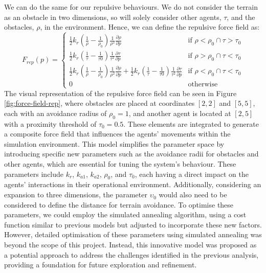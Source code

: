 \documentclass[12pt]{article}
\begin{document}
We can do the same for our repulsive behaviours. We do not consider the terrain as an obstacle in two dimensions, so will solely consider other agents, $\tau$, and the obstacles, $\rho$, in the environment. Hence, we can define the repulsive force field as:
\begin{equation}
    F_{rep}(p) = 
    \begin{cases}
        \frac{1}{2}k_r(\frac{1}{\rho}-\frac{1}{\rho_{0}})\frac{1}{\rho^2}\frac{\partial \rho}{\partial p} & \text{if } \rho < \rho_{0} \cap \tau > \tau_{0} \\
        \frac{1}{2}k_r(\frac{1}{\tau}-\frac{1}{\tau{0}})\frac{1}{\tau^2}\frac{\partial \tau}{\partial p} & \text{if } \rho > \rho_{0} \cap \tau < \tau_{0} \\
        \frac{1}{2}k_r(\frac{1}{\rho}-\frac{1}{\rho_{0}})\frac{1}{\rho^2}\frac{\partial \rho}{\partial p} + \frac{1}{2}k_r(\frac{1}{\tau}-\frac{1}{\tau{0}})\frac{1}{\tau^2}\frac{\partial \tau}{\partial p} & \text{if } \rho < \rho_{0} \cap \tau < \tau_{0} \\
        0 & \text{otherwise}
    \end{cases}
\end{equation}
The visual representation of the repulsive force field can be seen in Figure \ref{fig:force-field-rep}, where obstacles are placed at coordinates \([2,2]\) and \([5,5]\), each with an avoidance radius of \(\rho_0 = 1\), and another agent is located at \([2,5]\) with a proximity threshold of \(\tau_0 = 0.5\). These elements are integrated to generate a composite force field that influences the agents' movements within the simulation environment. This model simplifies the parameter space by introducing specific new parameters such as the avoidance radii for obstacles and other agents, which are essential for tuning the system's behaviour. These parameters include \(k_r\), \(k_{a1}\), \(k_{a2}\), \(\rho_0\), and \(\tau_0\), each having a direct impact on the agents' interactions in their operational environment. Additionally, considering an expansion to three dimensions, the parameter \(\upsilon_0\) would also need to be considered to define the distance for terrain avoidance. To optimise these parameters, we could employ the simulated annealing algorithm, using a cost function similar to previous models but adjusted to incorporate these new factors. However, detailed optimisation of these parameters using simulated annealing was beyond the scope of this project. Instead, this innovative model was proposed as a potential approach to address the challenges identified in the previous analysis, providing a foundation for future exploration and refinement.
\end{document}
